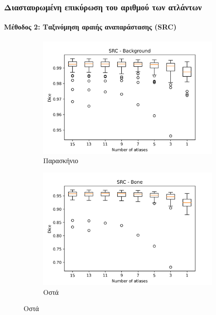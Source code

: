 \documentclass{beamer}
\begin{document}
\begin{frame}
\frametitle{Διασταυρωμένη επικύρωση του αριθμού των ατλάντων}
\framesubtitle{Μέθοδος 2: Ταξινόμηση αραιής αναπαράστασης (SRC)}

\begin{figure}[H]
    \centering

    \begin{subfigure}[b]{0.42\linewidth}
    \includegraphics[width=\linewidth]{SRC_Number_of_atlases_Background_plot.png}
    \caption{Παρασκήνιο}
    \end{subfigure}
    \begin{subfigure}[b]{0.42\linewidth}
    \includegraphics[width=\linewidth]{SRC_Number_of_atlases_Bone_plot.png}
    \caption{Οστά}
    \end{subfigure}


\end{figure}
\end{frame}
\end{document}
